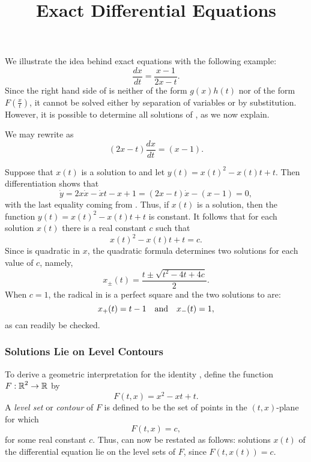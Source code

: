 \documentclass{ximera}
\title{Exact Differential Equations}
\begin{document}
\begin{abstract}
\end{abstract}
\maketitle


\label{S:exact} 

We illustrate the idea behind exact equations with the following example:
\begin{equation}  \label{eq:exactex1}
\frac{dx}{dt} = \frac{x-1}{2x-t}.
\end{equation}
Since the right hand side of  is neither of the form 
$g(x)h(t)$ nor of the form $F\left(\frac{x}{t}\right)$, it cannot be 
solved either by separation of variables or by substitution.  However, 
it is possible to determine all solutions of , as we now 
explain.

We may rewrite  as
\begin{equation} \label{eq:exactex1a}
(2x-t)\frac{dx}{dt} =(x-1). 
\end{equation}

Suppose that $x(t)$ is a solution to  and let 
$y(t)=x(t)^2 - x(t)t + t$.  Then differentiation shows that 
\[
\dot{y} = 2x\dot{x} -\dot{x}t-x + 1 = (2x-t)\dot{x} -(x-1) =0,
\]
with the last equality coming from .  Thus, if $x(t)$ is a 
solution, then the function $y(t)=x(t)^2 - x(t)t + t$ is constant.  It 
follows that for each solution $x(t)$ there is a real constant $c$ such that
\begin{equation} \label{eq:xc}
x(t)^2 - x(t)t + t = c.
\end{equation}
Since  is quadratic in $x$, the quadratic formula determines  
two solutions for each value of $c$, namely,
\begin{equation}  \label{E:twosolns}
x_\pm(t) = \frac{t\pm\sqrt{t^2-4t+4c}}{2}.
\end{equation}
When $c=1$, the radical in  is a perfect square and the 
two solutions to  are:
\[
x_+(t) = t-1 \quad\mbox{and}\quad x_-(t) = 1,
\]
as can readily be checked. 

\subsubsection*{Solutions Lie on Level Contours}

To derive a geometric interpretation for the identity ,
define the function $F:\mbox{$\Bbb{R}$}^2\rightarrow \mbox{$\Bbb{R}$}$ by
\[
F(t,x) = x^2 - xt + t.
\]
A {\em level set\/} or 
{\em contour\/} of $F$ is defined to be
the set of points in the $(t,x)$-plane for which
\[
F(t,x) = c,
\]
for some real constant $c$.  Thus,  can now be restated
as follows: solutions $x(t)$ of the differential equation  
lie on the level sets of $F$, since $F(t,x(t))=c$.
\end{document}
